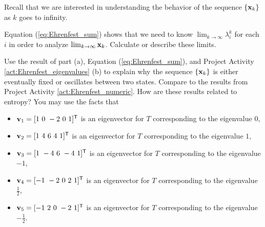 \begin{pactivity} \label{act:Ehrenfest_entropy} Recall that we are interested in understanding the behavior of the sequence $\{\mathbf{x}_k\}$ as $k$ goes to infinity.
	\ba
	\item Equation (\ref{eq:Ehrenfest_sum}) shows that we need to know $\lim_{k \to \infty} \lambda_i^k$ for each $i$ in order to analyze $\lim_{k \to \infty} \mathbf{x}_k$. Calculate or describe these limits.    

	\item Use the result of part (a), Equation (\ref{eq:Ehrenfest_sum}), and Project Activity \ref{act:Ehrenfest_eigenvalues} (b) to explain why the sequence $\{\mathbf{x}_k\}$ is either eventually fixed or oscillates between two states. Compare to the results from Project Activity \ref{act:Ehrenfest_numeric}. How are these results related to entropy? You may use the facts that 
\begin{itemize}
\item $\vv_1 = [1 \ 0 \ -2 \ 0 \ 1]^{\tr}$ is an eigenvector for $T$ corresponding to the eigenvalue $0$,
\item $\vv_2 = [1 \ 4 \ 6 \ 4 \ 1]^{\tr}$ is an eigenvector for $T$ corresponding to the eigenvalue $1$,
\item $\vv_3 = [1 \ -4 \ 6 \ -4 \ 1]^{\tr}$ is an eigenvector for $T$ corresponding to the eigenvalue $-1$,
\item $\vv_4 = [-1 \ -2 \ 0\ 2 \ 1]^{\tr}$ is an eigenvector for $T$ corresponding to the eigenvalue $\frac{1}{2}$,
\item $\vv_5 = [-1 \ 2 \ 0 \ -2 \ 1]^{\tr}$ is an eigenvector for $T$ corresponding to the eigenvalue $-\frac{1}{2}$.
\end{itemize}

	
\ea

\end{pactivity}


